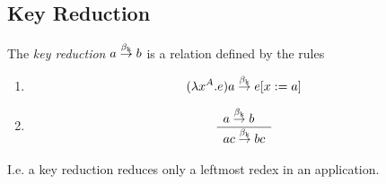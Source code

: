 \subsection{Key Reduction}

\begin{definition}
    The \emph{key reduction} $a \stackrel{\beta_{\text{k}}}{\to} b$ is a relation defined by the rules
    \begin{enumerate}
    \item
        $$(\lambda x^A.e) a \stackrel{\beta_{\text{k}}}{\to} e[x:=a]$$

    \item
        $$
        \begin{array}{l} 
            a \stackrel{\beta_{\text{k}}}{\to} b
         \\ \hline 
            ac \stackrel{\beta_{\text{k}}}{\to} bc
        \end{array}
        $$
    \end{enumerate}
    I.e. a key reduction reduces only a leftmost redex in an application.
\end{definition}





